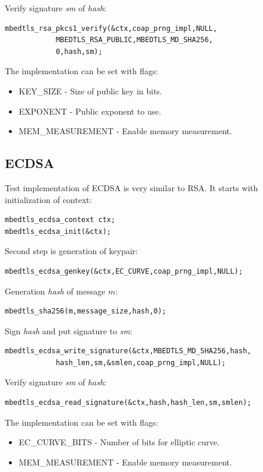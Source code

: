 \documentclass[thesis=M,english]{FITthesis}[2019/12/23]
\begin{document}
\noindent
Verify signature \textit{sm} of \textit{hash}:
\begin{lstlisting}[frame=single]
mbedtls_rsa_pkcs1_verify(&ctx,coap_prng_impl,NULL,
			MBEDTLS_RSA_PUBLIC,MBEDTLS_MD_SHA256,
			0,hash,sm);
\end{lstlisting}

\bigskip
\noindent
The implementation can be set with flags:
\begin{itemize}
\item	KEY\_SIZE - Size of public key in bits.
\item 	EXPONENT - Public exponent to use.
\item 	MEM\_MEASUREMENT  - Enable memory measurement.
\end{itemize}

\subsection{ECDSA}
Test implementation of ECDSA is very similar to RSA. It starts with initialization of context:
\begin{lstlisting}[frame=single]
mbedtls_ecdsa_context ctx;
mbedtls_ecdsa_init(&ctx);
\end{lstlisting}

\noindent
Second step is generation of keypair:
\begin{lstlisting}[frame=single]
mbedtls_ecdsa_genkey(&ctx,EC_CURVE,coap_prng_impl,NULL);
\end{lstlisting}

\noindent
Generation \textit{hash} of message $m$:
\begin{lstlisting}[frame=single]
mbedtls_sha256(m,message_size,hash,0);
\end{lstlisting}

\noindent
Sign \textit{hash} and put signature to \textit{sm}:
\begin{lstlisting}[frame=single]
mbedtls_ecdsa_write_signature(&ctx,MBEDTLS_MD_SHA256,hash,
			hash_len,sm,&smlen,coap_prng_impl,NULL);
\end{lstlisting}

\noindent
Verify signature \textit{sm} of \textit{hash}:
\begin{lstlisting}[frame=single]
mbedtls_ecdsa_read_signature(&ctx,hash,hash_len,sm,smlen);
\end{lstlisting}

\bigskip
\noindent
The implementation can be set with flags:
\begin{itemize}
\item	EC\_CURVE\_BITS  - Number of bits for elliptic curve.
\item 	MEM\_MEASUREMENT  - Enable memory measurement.
\end{itemize}
\end{document}
